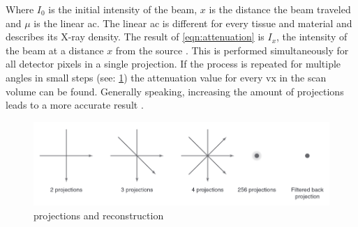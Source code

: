 \noindent
Where $I_{0}$ is the initial intensity of the beam, $x$ is the distance the beam traveled and $\mu$ is the linear \acrlong{ac}.
The linear \acrfull{ac} is different for every tissue and material and describes its X-ray density.
The result of \cref{eqn:attenuation} is $I_{x}$, the intensity of the beam at a distance $x$ from the source \cite{liMicrocomputedTomographySmall2008,orhanMicrocomputedTomographyMicroCT2020}.
This is performed simultaneously for all detector pixels in a single projection.
If the process is repeated for multiple angles in small steps (see: \cref{fig:ct-projections}) the attenuation value for every \gls{vx} in the scan volume can be found.
Generally speaking, increasing the amount of projections leads to a more accurate result \cite{liMicrocomputedTomographySmall2008,orhanMicrocomputedTomographyMicroCT2020}.
\begin{figure}[h]
	\centerline{
		\includegraphics[scale=0.5]{images/ct-projections.png}}
	\caption{\mct\space projections and reconstruction\cite{orhanMicrocomputedTomographyMicroCT2020}}
	\label{fig:ct-projections}
\end{figure}

